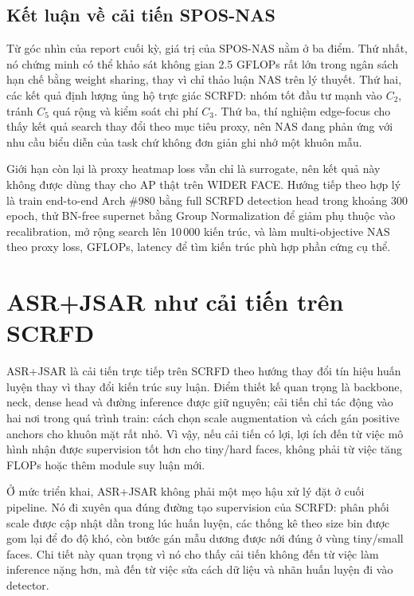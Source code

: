 \subsection{Kết luận về cải tiến SPOS-NAS}

Từ góc nhìn của report cuối kỳ, giá trị của SPOS-NAS nằm ở ba điểm. Thứ nhất, nó chứng minh có thể khảo sát không gian 2.5 GFLOPs rất lớn trong ngân sách hạn chế bằng weight sharing, thay vì chỉ thảo luận NAS trên lý thuyết. Thứ hai, các kết quả định lượng ủng hộ trực giác SCRFD: nhóm tốt đầu tư mạnh vào \(C_2\), tránh \(C_5\) quá rộng và kiểm soát chi phí \(C_3\). Thứ ba, thí nghiệm edge-focus cho thấy kết quả search thay đổi theo mục tiêu proxy, nên NAS đang phản ứng với nhu cầu biểu diễn của task chứ không đơn giản ghi nhớ một khuôn mẫu.

Giới hạn còn lại là proxy heatmap loss vẫn chỉ là surrogate, nên kết quả này không được dùng thay cho AP thật trên WIDER FACE. Hướng tiếp theo hợp lý là train end-to-end Arch \#980 bằng full SCRFD detection head trong khoảng 300 epoch, thử BN-free supernet bằng Group Normalization để giảm phụ thuộc vào recalibration, mở rộng search lên 10\,000 kiến trúc, và làm multi-objective NAS theo proxy loss, GFLOPs, latency để tìm kiến trúc phù hợp phần cứng cụ thể.


\section{ASR+JSAR như cải tiến trên SCRFD}

ASR+JSAR là cải tiến trực tiếp trên SCRFD theo hướng thay đổi tín hiệu huấn luyện thay vì thay đổi kiến trúc suy luận. Điểm thiết kế quan trọng là backbone, neck, dense head và đường inference được giữ nguyên; cải tiến chỉ tác động vào hai nơi trong quá trình train: cách chọn scale augmentation và cách gán positive anchors cho khuôn mặt rất nhỏ. Vì vậy, nếu cải tiến có lợi, lợi ích đến từ việc mô hình nhận được supervision tốt hơn cho tiny/hard faces, không phải từ việc tăng FLOPs hoặc thêm module suy luận mới.

Ở mức triển khai, ASR+JSAR không phải một mẹo hậu xử lý đặt ở cuối pipeline. Nó đi xuyên qua đúng đường tạo supervision của SCRFD: phân phối scale được cập nhật dần trong lúc huấn luyện, các thống kê theo size bin được gom lại để đo độ khó, còn bước gán mẫu dương được nới đúng ở vùng tiny/small faces. Chi tiết này quan trọng vì nó cho thấy cải tiến không đến từ việc làm inference nặng hơn, mà đến từ việc sửa cách dữ liệu và nhãn huấn luyện đi vào detector.

